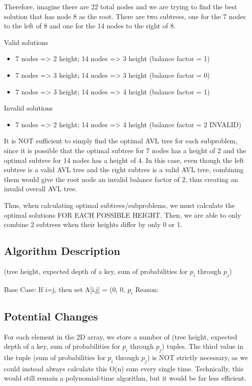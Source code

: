 \documentclass[a4paper]{article}
\begin{document}
Therefore, imagine there are 22 total nodes and we are trying to find the best solution that has node 8 as the root. There are two subtrees, one for the 7 nodes to the left of 8 and one for the 14 nodes to the right of 8.

Valid solutions
\begin{itemize}
    \item 7 nodes => 2 height; 14 nodes => 3 height (balance factor = 1)
    \item 7 nodes => 3 height; 14 nodes => 3 height (balance factor = 0)
    \item 7 nodes => 3 height; 14 nodes => 4 height (balance factor = 1)
\end{itemize}

Invalid solutions
\begin{itemize}
    \item 7 nodes => 2 height; 14 nodes => 4 height (balance factor = 2 INVALID)
\end{itemize}
It is NOT sufficient to simply find the optimal AVL tree for each subproblem, since it is possible that the optimal subtree for 7 nodes has a height of 2 and the optimal subtree for 14 nodes has a height of 4. In this case, even though the left subtree is a valid AVL tree and the right subtree is a valid AVL tree, combining them would give the root node an invalid balance factor of 2, thus creating an invalid overall AVL tree.

Thus, when calculating optimal subtrees/subproblems, we must calculate the optimal solutions FOR EACH POSSIBLE HEIGHT. Then, we are able to only combine 2 subtrees when their heights differ by only 0 or 1.

\subsection{Algorithm Description}


(tree height, expected depth of a key, sum of probabilities for $p_i$ through $p_j$)

Base Case:
    If i=j, then set A[i,j] = (0, 0, $p_i$
    Reason: 
    
\subsection{Potential Changes}
For each element in the 2D array, we store a number of (tree height, expected depth of a key, sum of probabilities for $p_i$ through $p_j$) tuples. The third value in the tuple (sum of probabilities for $p_i$ through $p_j$) is NOT strictly necessary, as we could instead always calculate this O(n) sum every single time. Technically, this would still remain a polynomial-time algorithm, but it would be far less efficient.
\end{document}
